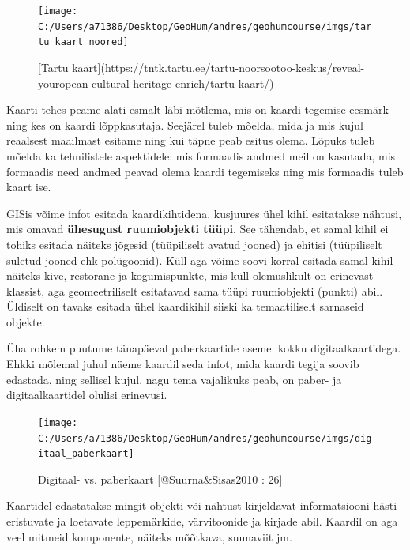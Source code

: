 \documentclass[
]{book}
\begin{document}
\begin{figure}

{\centering \texttt{[image: C:/Users/a71386/Desktop/GeoHum/andres/geohumcourse/imgs/tartu\_kaart\_noored]} 

}

\caption{[Tartu kaart](https://tntk.tartu.ee/tartu-noorsootoo-keskus/reveal-youropean-cultural-heritage-enrich/tartu-kaart/)}\label{fig:noored}
\end{figure}

Kaarti tehes peame alati esmalt läbi mõtlema, mis on kaardi tegemise eesmärk ning kes on kaardi lõppkasutaja. Seejärel tuleb mõelda, mida ja mis kujul reaalsest maailmast esitame ning kui täpne peab esitus olema. Lõpuks tuleb mõelda ka tehnilistele aspektidele: mis formaadis andmed meil on kasutada, mis formaadis need andmed peavad olema kaardi tegemiseks ning mis formaadis tuleb kaart ise.

GISis võime infot esitada kaardikihtidena, kusjuures ühel kihil esitatakse nähtusi, mis omavad \textbf{ühesugust ruumiobjekti tüüpi}. See tähendab, et samal kihil ei tohiks esitada näiteks jõgesid (tüüpiliselt avatud jooned) ja ehitisi (tüüpiliselt suletud jooned ehk polügoonid). Küll aga võime soovi korral esitada samal kihil näiteks kive, restorane ja kogumispunkte, mis küll olemuslikult on erinevast klassist, aga geomeetriliselt esitatavad sama tüüpi ruumiobjekti (punkti) abil. Üldiselt on tavaks esitada ühel kaardikihil siiski ka temaatiliselt sarnaseid objekte.

Üha rohkem puutume tänapäeval paberkaartide asemel kokku digitaalkaartidega. Ehkki mõlemal juhul näeme kaardil seda infot, mida kaardi tegija soovib edastada, ning sellisel kujul, nagu tema vajalikuks peab, on paber- ja digitaalkaartidel olulisi erinevusi.

\begin{figure}

{\centering \texttt{[image: C:/Users/a71386/Desktop/GeoHum/andres/geohumcourse/imgs/digitaal\_paberkaart]} 

}

\caption{Digitaal- vs. paberkaart [@Suurna&Sisas2010 : 26]}\label{fig:paber-digi}
\end{figure}

Kaartidel edastatakse mingit objekti või nähtust kirjeldavat informatsiooni hästi eristuvate ja loetavate leppemärkide, värvitoonide ja kirjade abil. Kaardil on aga veel mitmeid komponente, näiteks mõõtkava, suunaviit jm.
\end{document}
